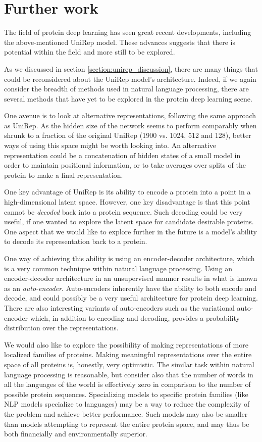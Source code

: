 \documentclass[a4paper,12pt]{article}
\begin{document}
\clearpage
\section{Further work}
The field of protein deep learning has seen great recent developments, including the above-mentioned UniRep model. These advances suggests that there is potential within the field and more still to be explored.

As we discussed in section \ref{section:unirep_discussion}, there are many things that could be reconsidered about the UniRep model's architecture. Indeed, if we again consider the breadth of methods used in natural language processing, there are several methods that have yet to be explored in the protein deep learning scene.

One avenue is to look at alternative representations, following the same approach as UniRep. As the hidden size of the network seems to perform comparably when shrunk to a fraction of the original UniRep (1900 vs. 1024, 512 and 128), better ways of using this space might be worth looking into. An alternative representation could be a concatenation of hidden states of a small model in order to maintain positional information, or to take averages over splits of the protein to make a final representation.

One key advantage of UniRep is its ability to encode a protein into a point in a high-dimensional latent space. However, one key disadvantage is that this point cannot be \textit{decoded} back into a protein sequence. Such decoding could be very useful, if one wanted to explore the latent space for candidate desirable proteins. One aspect that we would like to explore further in the future is a model's ability to decode its representation back to a protein.

One way of achieving this ability is using an encoder-decoder architecture, which is a very common technique within natural language processing. Using an encoder-decoder architecture in an unsupervised manner results in what is known as an \textit{auto-encoder}. Auto-encoders inherently have the ability to both encode and decode, and could possibly be a very useful architecture for protein deep learning. There are also interesting variants of auto-encoders such as the variational auto-encoder which, in addition to encoding and decoding, provides a probability distribution over the representations.

We would also like to explore the possibility of making representations of more localized families of proteins. Making meaningful representations over the entire space of all proteins is, honestly, very optimistic. The similar task within natural language processing is reasonable, but consider also that the number of words in all the languages of the world is effectively zero in comparison to the number of possible protein sequences. Specializing models to specific protein families (like NLP models specialize to languages) may be a way to reduce the complexity of the problem and achieve better performance. Such models may also be smaller than models attempting to represent the entire protein space, and may thus be both financially and environmentally superior.
\end{document}

